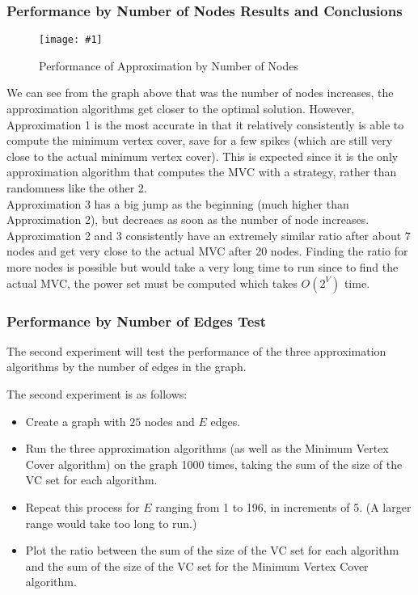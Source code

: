 \documentclass[12pt]{article}
\newcommand{\firgureBuffered}[2]
{
    \begin{figure}[ht!]
        \centering
        \texttt{[image: \#1]}
        \caption{#2}
    \end{figure}
}
\begin{document}
\subsubsection{Performance by Number of Nodes Results and Conclusions}

\FloatBarrier{}
\firgureBuffered{images/approxexperiments/Nodes.png}{Performance of Approximation by Number of Nodes}
\FloatBarrier{}

We can see from the graph above that was the number of nodes increases, the approximation algorithms get closer to the optimal solution. However, Approximation 1 is the most accurate in that it relatively consistently is able to compute the minimum vertex cover, save for a few spikes (which are still very close to the actual minimum vertex cover). This is expected since it is the only approximation algorithm that computes the MVC with a strategy, rather than randomness like the other 2. \\

Approximation 3 has a big jump as the beginning (much higher than Approximation 2), but decreaes as soon as the number of node increases. Approximation 2 and 3 consistently have an extremely similar ratio after about 7 nodes and get very close to the actual MVC after 20 nodes. Finding the ratio for more nodes is possible but would take a very long time to run since to find the actual MVC, the power set must be computed which takes $O(2^V)$ time. \\

\subsubsection{Performance by Number of Edges Test}

The second experiment will test the performance of the three approximation algorithms by the number of edges in the graph.

The second experiment is as follows:

\begin{itemize}
    \item Create a graph with $25$ nodes and $E$ edges.
    \item Run the three approximation algorithms (as well as the Minimum Vertex Cover algorithm) on the graph 1000 times, taking the sum of the size of the VC set for each algorithm.
    \item Repeat this process for $E$ ranging from 1 to 196, in increments of 5. (A larger range would take too long to run.)
    \item Plot the ratio between the sum of the size of the VC set for each algorithm and the sum of the size of the VC set for the Minimum Vertex Cover algorithm.
\end{itemize}
\newpage
\end{document}

